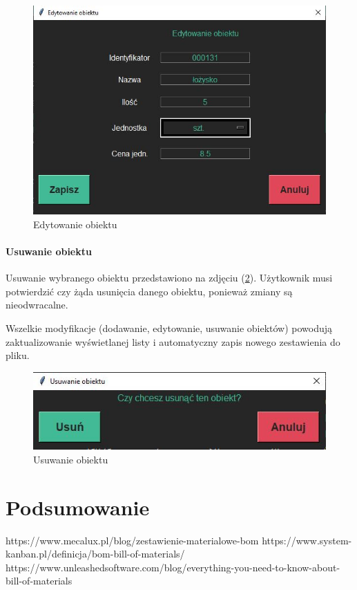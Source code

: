 \documentclass[12pt,twoside]{article}
\begin{document}
\begin{figure}[ht]
	\centering
	\includegraphics[width=\textwidth]{figures/app/bom_edit_item.jpg}
	\caption{Edytowanie obiektu}
\label{fig:app:bom_edit_item}
\end{figure}

\paragraph*{Usuwanie obiektu}
Usuwanie wybranego obiektu przedstawiono na zdjęciu (\ref{fig:app:bom_remove_item}). Użytkownik musi potwierdzić czy żąda usunięcia danego obiektu, ponieważ zmiany są nieodwracalne.

Wszelkie modyfikacje (dodawanie, edytowanie, usuwanie obiektów) powodują zaktualizowanie wyświetlanej listy i automatyczny zapis nowego zestawienia do pliku.

\begin{figure}[ht]
	\centering
	\includegraphics[width=\textwidth]{figures/app/bom_remove_item.jpg}
	\caption{Usuwanie obiektu}
\label{fig:app:bom_remove_item}
\end{figure}


\clearpage
\section{Podsumowanie}

\clearpage

\begin{thebibliography}{8}
\label{sec:bibliography}
https://www.mecalux.pl/blog/zestawienie-materialowe-bom
https://www.system-kanban.pl/definicja/bom-bill-of-materials/
https://www.unleashedsoftware.com/blog/everything-you-need-to-know-about-bill-of-materials
\end{thebibliography}
\clearpage
\end{document}
